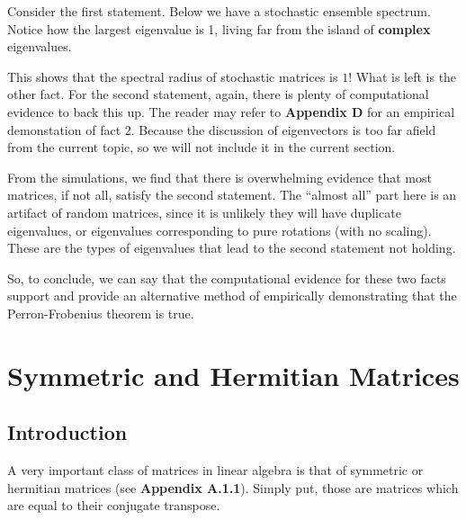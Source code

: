 Consider the first statement. Below we have a stochastic ensemble spectrum.
Notice how the largest eigenvalue is 1, living far from the island of \textbf{complex} eigenvalues.


This shows that the spectral radius of stochastic matrices is $1$! What is left is the other fact.
For the second statement, again, there is plenty of computational evidence to back this up.
The reader may refer to \textbf{Appendix D} for an empirical demonstation of fact 2.
Because the discussion of eigenvectors is too far afield from the current topic, so we will not include it in the current section.

From the simulations, we find that there is overwhelming evidence that most matrices, if not all, satisfy the second statement.
The ``almost all'' part here is an artifact of random matrices, since it is unlikely they will have duplicate eigenvalues, or eigenvalues corresponding to pure rotations (with no scaling).
These are the types of eigenvalues that lead to the second statement not holding. \newline

 So, to conclude, we can say that the computational evidence for these two facts support and provide an alternative method of empirically demonstrating that the Perron-Frobenius theorem is true.


\newpage
\section{Symmetric and Hermitian Matrices}

\subsection{Introduction}
A very important class of matrices in linear algebra is that of symmetric or hermitian matrices (see \textbf{Appendix A.1.1}). Simply put, those are matrices which are equal to their conjugate transpose.

